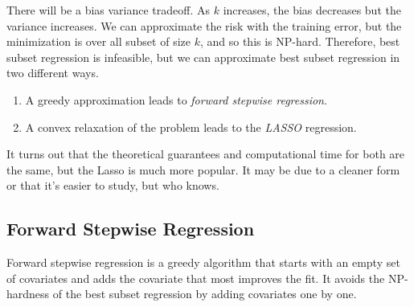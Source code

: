   There will be a bias variance tradeoff. As $k$ increases, the bias decreases but the variance increases. We can approximate the risk with the training error, but the minimization is over all subset of size $k$, and so this is NP-hard. Therefore, best subset regression is infeasible, but we can approximate best subset regression in two different ways. 
  \begin{enumerate}
    \item A greedy approximation leads to \textit{forward stepwise regression}. 
    \item A convex relaxation of the problem leads to the \textit{LASSO} regression. 
  \end{enumerate}
  It turns out that the theoretical guarantees and computational time for both are the same, but the Lasso is much more popular. It may be due to a cleaner form or that it's easier to study, but who knows. 

\subsection{Forward Stepwise Regression} 

  Forward stepwise regression is a greedy algorithm that starts with an empty set of covariates and adds the covariate that most improves the fit. It avoids the NP-hardness of the best subset regression by adding covariates one by one. 

